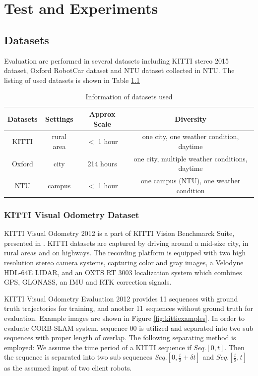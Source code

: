 
\chapter{Test and Experiments}

\section{Datasets}

Evaluation are performed in several datasets including KITTI stereo 2015 dataset\cite{Menze2015CVPR},  Oxford RobotCar dataset\cite{maddern20171} and NTU dataset collected in NTU. The listing of used datasets is shown in Table \ref{tbl:datasetsinfo}


\begin{table}
	\centering
	\caption{Information of datasets used }
	\begin{tabular}{|c|c|c|c|}
		\hline
		Datasets & Settings & Approx Scale & Diversity \\
		\hline
		KITTI &  rural area & $<$ 1 hour & one city, one weather condition, daytime \\
		\hline
		Oxford &  city & 214 hours & one city, multiple weather conditions, daytime \\
		\hline
		NTU &  campus & $<$ 1 hour & one campus (NTU), one weather condition \\
		\hline
	\end{tabular}
	\label{tbl:datasetsinfo}
\end{table}

\subsection{KITTI Visual Odometry Dataset}

KITTI Visual Odometry 2012 is a part of KITTI Vision Benchmarck Suite, presented in \cite{Geiger2012CVPR,Menze2015CVPR}. KITTI datasets are captured by driving around a mid-size city, in rural areas and on highways. The recording platform is equipped with two high resolution stereo camera systems, capturing color and gray images, a Velodyne HDL-64E LIDAR, and an OXTS RT 3003 localization system which combines GPS, GLONASS, an IMU and RTK correction signals.

KITTI Visual Odometry Evaluation 2012 provides 11 sequences with ground truth trajectories for training, and another 11 sequences without ground truth for evaluation. Example images are shown in Figure \ref{fig:kittiexamples}. In order to evaluate CORB-SLAM system, sequence 00 is utilized and separated into two sub sequences with proper length of overlap. The following separating method is employed: We assume the time period of a KITTI sequence if $Seq.[0,t]$. Then the sequence is separated into two sub sequences $Seq.[0,\frac{t}{2}+\delta{t}]$ and $Seq.[\frac{t}{2},t]$ as the assumed input of two client robots. 

